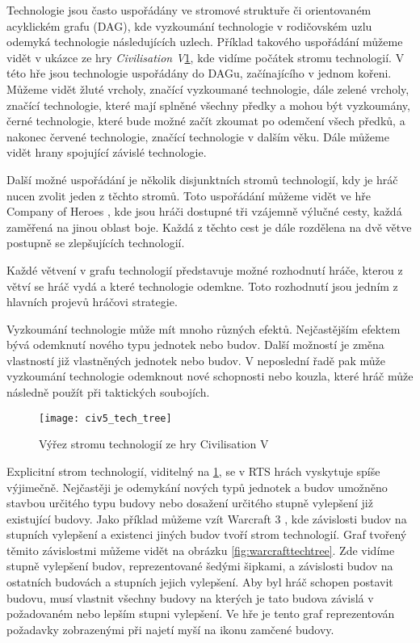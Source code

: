 Technologie jsou často uspořádány ve stromové struktuře či orientovaném acyklickém grafu (DAG), kde vyzkoumání technologie v rodičovském uzlu odemyká technologie následujících uzlech. Příklad takového uspořádání můžeme vidět v ukázce ze hry \emph{Civilisation V}\citep{site:civ5}\ref{fig:civ5techtree}, kde vidíme počátek stromu technologií. V této hře jsou technologie uspořádány do DAGu, začínajícího v jednom kořeni. Můžeme vidět žluté vrcholy, značící vyzkoumané technologie, dále zelené vrcholy, značící technologie, které mají splněné všechny předky a mohou být vyzkoumány, černé technologie, které bude možné začít zkoumat po odemčení všech předků, a nakonec červené technologie, značící technologie v dalším věku. Dále můžeme vidět hrany spojující závislé technologie. 

Další možné uspořádání je několik disjunktních stromů technologií, kdy je hráč nucen zvolit jeden z těchto stromů. 
Toto uspořádání můžeme vidět ve hře Company of Heroes \citep{site:COH}, kde jsou hráči dostupné tři vzájemně výlučné cesty, každá zaměřená na jinou oblast boje. Každá z těchto cest je dále rozdělena na dvě větve postupně se zlepšujících technologií.

Každé větvení v grafu technologií představuje možné rozhodnutí hráče, kterou z větví se hráč vydá a které technologie odemkne. Toto rozhodnutí jsou jedním z hlavních projevů hráčovi strategie.

Vyzkoumání technologie může mít mnoho různých efektů. Nejčastějším efektem bývá odemknutí nového typu jednotek nebo budov. Další možností je změna vlastností již vlastněných jednotek nebo budov. V neposlední řadě pak může vyzkoumání technologie odemknout nové schopnosti nebo kouzla, které hráč může následně použít při taktických soubojích. 

\begin{figure}[h]	
	\centering
	\texttt{[image: civ5\_tech\_tree]}
	\caption{Výřez stromu technologií ze hry Civilisation V}
	\label{fig:civ5techtree}
\end{figure}


Explicitní strom technologií, viditelný na \ref{fig:civ5techtree}, se v RTS hrách vyskytuje spíše výjimečně. Nejčastěji je odemykání nových typů jednotek a budov umožněno stavbou určitého typu budovy nebo dosažení určitého stupně vylepšení již existující budovy. Jako příklad můžeme vzít Warcraft 3 \citep{site:warcraft3}, kde závislosti budov na stupních vylepšení a existenci jiných budov tvoří strom technologií. Graf tvořený těmito závislostmi můžeme vidět na obrázku \ref{fig:warcrafttechtree}. Zde vidíme stupně vylepšení budov, reprezentované šedými šipkami, a závislosti budov na ostatních budovách a stupních jejich vylepšení. Aby byl hráč schopen postavit budovu, musí vlastnit všechny budovy na kterých je tato budova závislá v požadovaném nebo lepším stupni vylepšení. Ve hře je tento graf reprezentován požadavky zobrazenými při najetí myší na ikonu zamčené budovy.

